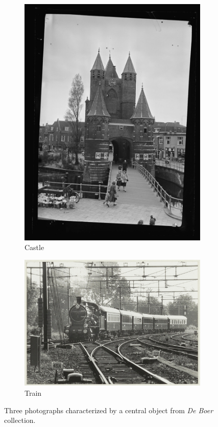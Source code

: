 \documentclass[a4paper,twoside]{article}
\begin{document}
\begin{figure}
 \begin{subfigure}[b]{0.33\textwidth}
    \includegraphics[width=\textwidth]{figures/castle.jpg}
    \caption{Castle}
    \label{fig:examplesb}
     \vspace{0.5em}
 \end{subfigure}
 \begin{subfigure}[b]{0.33\textwidth}
    \includegraphics[width=\textwidth]{figures/train.jpg}
    \caption{Train}
    \label{fig:examplesc}
 \end{subfigure}
  \caption{Three photographs characterized by a central object from \textit{De Boer} collection.}
  \label{fig:examples_objects}
   \vspace{0.5em}
\end{figure}
\end{document}
